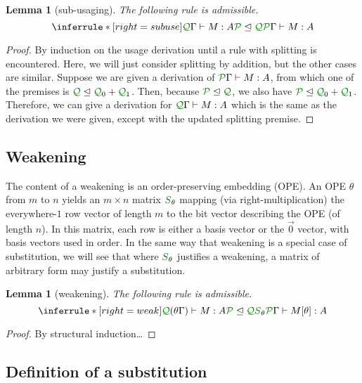 \documentclass[submission,copyright,creativecommons]{eptcs}
\newtheorem{lemma}[theorem]{Lemma}
\begin{document}
\begin{lemma}[sub-usaging]\label{lem:subuse}
  The following rule is admissible.
  \[
    \inferrule*[right=subuse]{
      \ctx{\Gamma}{Q} \vdash M : A
      \\ \resctx P \subres \resctx Q
    }
    {
      \ctx{\Gamma}{P} \vdash M : A
    }
  \]
\end{lemma}
\begin{proof}
  By induction on the usage derivation until a rule with splitting is
  encountered.
  Here, we will just consider splitting by addition, but the other cases are
  similar.
  Suppose we are given a derivation of $\ctx{\Gamma}{P} \vdash M : A$,
  from which one of the premises is
  $\resctx Q \subres \resctx Q_0 + \resctx Q_1$.
  Then, because $\resctx P \subres \resctx Q$, we also have
  $\resctx P \subres \resctx Q_0 + \resctx Q_1$.
  Therefore, we can give a derivation for
  $\ctx{\Gamma}{Q} \vdash M : A$ which is the same as the derivation we
  were given, except with the updated splitting premise.
\end{proof}

\subsection{Weakening}

The content of a weakening is an order-preserving embedding (OPE).
An OPE $\theta$ from $m$ to $n$ yields an $m \times n$ matrix $\resmat S_\theta$
mapping (via right-multiplication) the everywhere-$1$ row vector of length $m$
to the bit vector describing the OPE (of length $n$).
In this matrix, each row is either a basis vector or the $\vec 0$ vector, with
basis vectors used in order.
In the same way that weakening is a special case of substitution, we will see
that where $\resmat S_\theta$ justifies a weakening, a matrix of arbitrary form
may justify a substitution.

\begin{lemma}[weakening]\label{lem:weak}
  The following rule is admissible.
  \[
    \inferrule*[right=weak]{
      \ctx{(\theta\Gamma)}{Q} \vdash M : A
      \\ \resctx P \subres \resctx Q \resmat S_\theta
    }
    {
      \ctx{\Gamma}{P} \vdash M[\theta] : A
    }
  \]
\end{lemma}
\begin{proof}
  By structural induction\ldots
\end{proof}

\subsection{Definition of a substitution}
\end{document}
